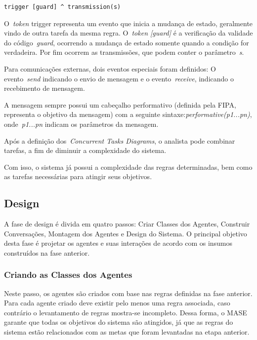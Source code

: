 \begin{lstlisting}[label=code:sintaxe-concurrent-task,caption=Sintaxe da mudança de estado.]
	trigger [guard] ^ transmission(s)
\end{lstlisting}

O~\emph{token} trigger representa um evento que inicia a mudança de estado, geralmente vindo de outra tarefa da mesma regra. O~\emph{token [guard]} é a verificação da validade do código~\emph{guard}, ocorrendo a mudança de estado somente quando a condição for verdadeira. Por fim ocorrem as transmissões, que podem conter o parâmetro~\emph{s}.

Para comunicações externas, dois eventos especiais foram definidos: O evento~\emph{send} indicando o envio de mensagem e o evento~\emph{receive}, indicando o recebimento de mensagem.

A mensagem sempre possui um cabeçalho performativo (definida pela FIPA, representa o objetivo da mensagem) com a seguinte sintaxe:\emph{performative(p1...pn)}, onde~\emph{p1...pn} indicam os parâmetros da mensagem.

Após a definição dos~\emph{Concurrent Tasks Diagrams}, o analista pode combinar tarefas, a fim de diminuir a complexidade do sistema. 

Com isso, o sistema já possui a complexidade das regras determinadas, bem como as tarefas necessárias para atingir seus objetivos.

\subsection{Design}

A fase de design é divida em quatro passos: Criar Classes dos Agentes, Construir Conversações, Montagem dos Agentes e Design do Sistema. O principal objetivo desta fase é projetar os agentes e suas interações de acordo com os insumos construídos na fase anterior.

\subsubsection{Criando as Classes dos Agentes}

Neste passo, os agentes são criados com base nas regras definidas na fase anterior. Para cada agente criado deve existir pelo menos uma regra associada, caso contrário o levantamento de regras mostra-se incompleto. Dessa forma, o MASE garante que todas os objetivos  do sistema são atingidos, já que as regras do sistema estão relacionados com as metas que foram levantadas na etapa anterior.

